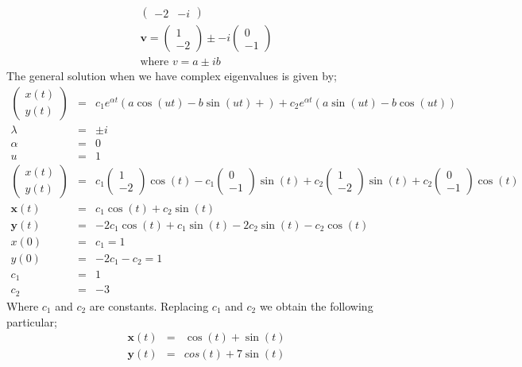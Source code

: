 \documentclass[12pt,a4paper]{article}
\begin{document}
\begin{enumerate}
\begin{eqnarray*}
\begin{pmatrix}
-2&-i
\end{pmatrix}\\
\textbf{v}=\begin{pmatrix}
1\\
-2
\end{pmatrix} \pm -i
\begin{pmatrix}
0\\
-1
\end{pmatrix}\\
\text{where}\,\, v=a \pm ib
\end{eqnarray*}
The general solution when we have complex eigenvalues is given by;
\begin{eqnarray*}
\begin{pmatrix}
x(t) \\
y(t)
\end{pmatrix}&=&c_1e^{\alpha t}\left( a\cos(ut)-b\sin(ut)+ \right) +c_2e^{\alpha t}\left( a\sin(ut)-b\cos(ut)\right)\\
\lambda &=& \pm i\\
\alpha &=& 0\\
u&=&1\\
\begin{pmatrix}
x(t) \\
y(t)
\end{pmatrix}& =&c_1 \begin{pmatrix}
1\\
-2
\end{pmatrix} \cos (t)-c_1
\begin{pmatrix}
0\\
-1
\end{pmatrix} \sin (t)+ c_2\begin{pmatrix}
1\\
-2
\end{pmatrix} \sin (t)+c_2
\begin{pmatrix}
0\\
-1
\end{pmatrix} \cos (t)\\
\textbf{x}(t)&=&c_1 \cos(t)+c_2 \sin(t)\\
\textbf{y}(t)&=&-2c_1 \cos(t)+c_1 \sin(t)-2c_2\sin(t)-c_2\cos(t) \\
x(0)&=&c_1=1\\
y(0)&=&-2c_1-c_2=1\\
c_1&=&1\\
c_2&=&-3
\end{eqnarray*}
Where $c_1$ and  $c_2$ are constants. Replacing  $c_1$ and  $c_2$  we obtain the following particular;
\begin{eqnarray*}
\textbf{x}(t)&=& \cos(t)+ \sin(t)\\
\textbf{y}(t)&=&cos(t)+7 \sin(t)
\end{eqnarray*}


\end{enumerate}
\end{document}
